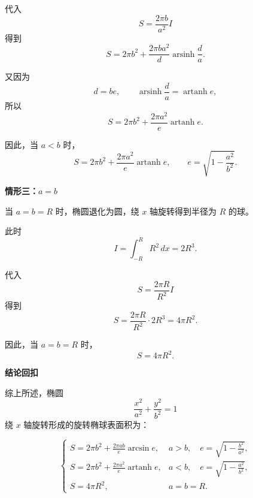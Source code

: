 \begin{proofbox}
\begin{description}[style=nextline, leftmargin=2.8em, labelsep=0.5em, itemsep=0.55em]
		      代入
		      \[
			      S=\frac{2\pi b}{a^{2}}I
		      \]
		      得到
		      \[
			      S
			      =
			      2\pi b^{2}
			      +
			      \frac{2\pi ba^{2}}{d}
			      \operatorname{arsinh}\frac{d}{a}.
		      \]

		      又因为
		      \[
			      d=be,
			      \qquad
			      \operatorname{arsinh}\frac{d}{a}
			      =
			      \operatorname{artanh}e,
		      \]
		      所以
		      \[
			      S
			      =
			      2\pi b^{2}
			      +
			      \frac{2\pi a^{2}}{e}
			      \operatorname{artanh}e.
		      \]

		      因此，当 $a<b$ 时，
		      \[
			      \boxed{
				      S
				      =
				      2\pi b^{2}
				      +
				      \frac{2\pi a^{2}}{e}
				      \operatorname{artanh}e
			      },
			      \qquad
			      e=\sqrt{1-\frac{a^{2}}{b^{2}}}.
		      \]

	\end{description}

	\medskip

	\textbf{\textcolor{CProof}{情形三：$a=b$}}

	\begin{description}[style=nextline, leftmargin=2.8em, labelsep=0.5em, itemsep=0.55em]

		\item[\textbf{步骤八（退化为球）：}]
		      当 $a=b=R$ 时，椭圆退化为圆，绕 $x$ 轴旋转得到半径为 $R$ 的球。

		      此时
		      \[
			      I
			      =
			      \int_{-R}^{R}R^{2}\,dx
			      =
			      2R^{3}.
		      \]

		      代入
		      \[
			      S=\frac{2\pi R}{R^{2}}I
		      \]
		      得到
		      \[
			      S
			      =
			      \frac{2\pi R}{R^{2}}\cdot 2R^{3}
			      =
			      4\pi R^{2}.
		      \]

		      因此，当 $a=b=R$ 时，
		      \[
			      \boxed{
				      S=4\pi R^{2}
			      }.
		      \]

	\end{description}

	\medskip

	\textbf{\textcolor{CProof}{结论回扣}}

	综上所述，椭圆
	\[
		\frac{x^{2}}{a^{2}}+\frac{y^{2}}{b^{2}}=1
	\]
	绕 $x$ 轴旋转形成的旋转椭球表面积为：

	\[
		\begin{cases}
			\displaystyle
			S
			=
			2\pi b^{2}
			+
			\frac{2\pi ab}{e}\arcsin e,
			 &
			\displaystyle
			a>b,\quad
			e=\sqrt{1-\frac{b^{2}}{a^{2}}},
			\\[1.2em]
			\displaystyle
			S
			=
			2\pi b^{2}
			+
			\frac{2\pi a^{2}}{e}\operatorname{artanh}e,
			 &
			\displaystyle
			a<b,\quad
			e=\sqrt{1-\frac{a^{2}}{b^{2}}},
			\\[1.2em]
			\displaystyle
			S=4\pi R^{2},
			 &
			a=b=R.
		\end{cases}
	\]

\end{proofbox}